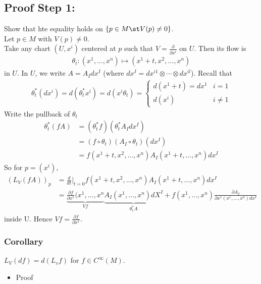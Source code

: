\documentclass[11pt]{article}
\begin{document}
\subsection*{Proof Step 1:}
\label{sec:orgd1eb71a}
Show that hte equality holds on \(\{p\in M\st V(p)\neq0\}\).\\

Let \(p\in M\) with \(V(p)\neq 0\).\\
Take any chart \((U,x^{i})\) centered at \(p\) such that \(V=\frac{\partial}{\partial x^{i}}\) on \(U\). Then its flow is\\
\begin{align*}
  \theta_{t}:(x^{1},\ldots,x^{n})\mapsto (x^{1}+t,x^{2},\ldots, x^{n})
\end{align*}
in \(U\). In \(U\), we write \(A=A_{I}dx^{I}\) (where \(dx^{I}=dx^{i1}\otimes\cdots\otimes dx^{il}\)). Recall that\\
\begin{align*}
  \theta_{t}^{*}(dx^{i})
  =d(\theta_{t}^{*}x^{i})
  =d(x^{i}\theta_{t})=
  \begin{cases}
    d(x^{1}+t)=dx^{1} & i=1 \\
    d(x^{i}) & i\neq 1
  \end{cases}
\end{align*}
Write the pullback of \(\theta_{t}\)\\
\begin{align*}
  \theta_{t}^{*}(fA)
  &=(\theta_{t}^{*}f)(\theta_{t}^{*}A_{I}dx^{I}) \\
  &=(f\circ\theta_{t})(A_{I}\circ\theta_{t})(dx^{I}) \\
  &=f(x^{1}+t,x^{2},\ldots,x^{n})A_{I}(x^{1}+t,\ldots,x^{n})dx^{I}
\end{align*}
So for \(p=(x^{i})\),\\
\begin{align*}
  (L_{V}(fA))_{p}
  &=\frac{d}{dt}\Big|_{t=0}f(x^{1}+t,x^{2},\ldots,x^{n})A_{I}(x^{1}+t,\ldots,x^{n})dx^{I} \\
  &=\underbrace{\frac{\partial f}{\partial x^{1}}(x^{1},\ldots,x^{n}}_{Vf}\underbrace{A_{I}(x^{1},\ldots,x^{n})dX^{I}}_{\theta^{*}_{t}A}+f(x^{1},\ldots,x^{n})\frac{\partial A_{I}}{\partial x^{1}        (x^{1},\ldots,x^{n})dx^{I}}
\end{align*}
inside U. Hence \(Vf=\frac{\partial f}{\partial x^{1}}\).\\
\subsubsection*{Corollary}
\label{sec:orgbe63dff}
\(L_{V}(df)=d(L_{v}f)\) for \(f\in C^{\infty}(M)\).\\
\begin{itemize}
\item Proof\\
\end{itemize}
\end{document}
